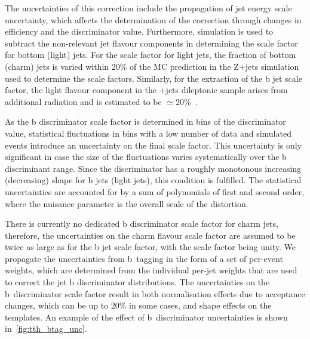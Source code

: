 The uncertainties of this correction include the propagation of jet energy scale uncertainty, which affects the determination of the correction through changes in efficiency and the discriminator value. Furthermore, simulation is used to subtract the non-relevant jet flavour components in determining the scale factor for bottom (light) jets. For the scale factor for light jets, the fraction of bottom (charm) jets is varied within 20\% of the MC prediction in the Z+jets simulation used to determine the scale factors. Similarly, for the extraction of the b jet scale factor, the light flavour component in the \ttbar+jets dileptonic sample arises from additional radiation and is estimated to be $\simeq20\%$~\cite{CMS-PAS-BTV-15-001}.

As the b discriminator scale factor is determined in bins of the discriminator value, statistical fluctuations in bins with a low number of data and simulated events introduce an uncertainty on the final scale factor. This uncertainty is only significant in case the size of the fluctuations varies systematically over the b discriminant range. Since the discriminator has a roughly monotonous increasing (decreasing) shape for b jets (light jets), this condition is fulfilled. The statistical uncertainties are accounted for by a sum of polynomials of first and second order, where the nuisance parameter is the overall scale of the distortion.

There is currently no dedicated b discriminator scale factor for charm jets, therefore, the uncertainties on the charm flavour scale factor are assumed to be twice as large as for the b jet scale factor, with the  scale factor being unity. We propagate the uncertainties from b~tagging in the form of a set of per-event weights, which are determined from the individual per-jet weights that are used to correct the jet b discriminator distributions. The uncertainties on the b~discriminator scale factor result in both normalisation effects due to acceptance changes, which can be up to 20\% in some cases, and shape effects on the templates. An example of the effect of b~discriminator uncertainties is shown in~\cref{fig:tth_btag_unc}. 


